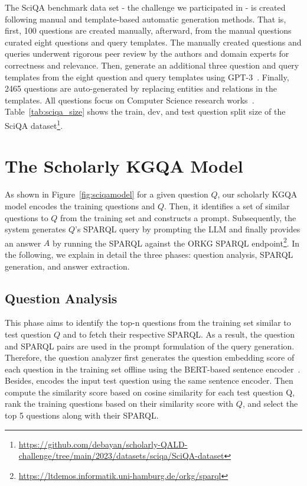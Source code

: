 \documentclass[
]{ceurart}
\begin{document}
The SciQA benchmark data set - the challenge we participated in - is created following manual and template-based automatic generation methods. That is, first, 100 questions are created manually, afterward, from the manual questions curated eight questions and query templates. The manually created questions and queries underwent rigorous peer review by the authors and domain experts for correctness and relevance. Then, generate an additional three question and query templates from the eight question and query templates using  GPT-3~\cite{NEURIPS2020_1457c0d6}. Finally, 2465 questions are auto-generated by replacing entities and relations in the templates. All questions focus on Computer Science research works~\cite{auer2023sciqa}. Table~\ref{tab:sciqa_size} shows the train, dev, and test question split size of the SciQA dataset\footnote{\url{https://github.com/debayan/scholarly-QALD-challenge/tree/main/2023/datasets/sciqa/SciQA-dataset}}.

\section{The Scholarly KGQA Model}\label{approach}

As shown in Figure~\ref{fig:sciqamodel} for a given question $Q$, our scholarly KGQA model encodes the training questions and $Q$. Then, it identifies a set of similar questions to $Q$ from the training set and constructs a prompt. Subsequently, the system generates $Q$'s SPARQL query by prompting the LLM and finally provides an answer $A$ by running the SPARQL against the ORKG SPARQL endpoint\footnote{\url{https://ltdemos.informatik.uni-hamburg.de/orkg/sparql}}. In the following, we explain in detail the three phases: question analysis, SPARQL generation, and answer extraction.

\subsection{Question Analysis}
This phase aims to identify the top-n questions from the training set similar to test question $Q$ and to fetch their respective SPARQL. As a result, the question and SPARQL pairs are used in the prompt formulation of the query generation. Therefore, the question analyzer first generates the question embedding score of each question in the training set offline using the BERT-based sentence encoder~\cite{KOCAMAN2021100058}. Besides, encodes the input test question using the same sentence encoder. Then compute the similarity score based on cosine similarity for each test question Q, rank the training questions based on their similarity score with $Q$, and select the top 5 questions along with their SPARQL.
\end{document}
